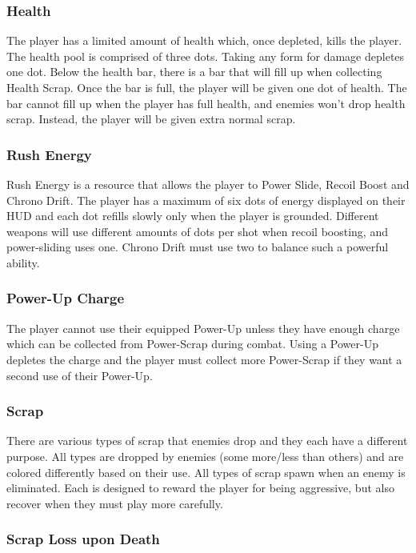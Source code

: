 \documentclass[12pt]{article}
\begin{document}
\subsubsection{Health}

The player has a limited amount of health which, once depleted, kills the player. The health pool is comprised of three dots. Taking any form for damage depletes one dot. Below the health bar, there is a bar that will fill up when collecting Health Scrap. Once the bar is full, the player will be given one dot of health. The bar cannot fill up when the player has full health, and enemies won't drop health scrap. Instead, the player will be given extra normal scrap. 

\subsubsection{Rush Energy}

Rush Energy is a resource that allows the player to Power Slide, Recoil Boost and Chrono Drift. The player has a maximum of six dots of energy displayed on their HUD and each dot refills slowly only when the player is grounded. Different weapons will use different amounts of dots per shot when recoil boosting, and power-sliding uses one. Chrono Drift must use two to balance such a powerful ability. 

\subsubsection{Power-Up Charge}

The player cannot use their equipped Power-Up unless they have enough charge which can be collected from Power-Scrap during combat. Using a Power-Up depletes the charge and the player must collect more Power-Scrap if they want a second use of their Power-Up. 

\subsubsection{Scrap}

There are various types of scrap that enemies drop and they each have a different purpose. All types are dropped by enemies (some more/less than others) and are colored differently based on their use. All types of scrap spawn when an enemy is eliminated. Each is designed to reward the player for being aggressive, but also recover when they must play more carefully. 

\subsubsection{Scrap Loss upon Death}
\end{document}
